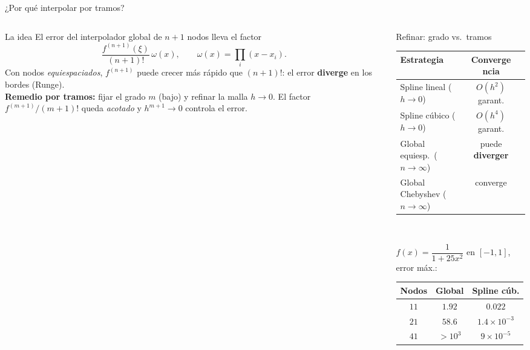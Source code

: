 \documentclass[aspectratio=169,10pt]{beamer}
\begin{document}
\begin{frame}{¿Por qué interpolar por tramos?}
\begin{columns}[T]
\begin{column}{0.49\textwidth}
\begin{cardidea}{La idea}{\faLightbulb}
{\footnotesize El error del interpolador global de $n{+}1$ nodos lleva el factor
\[
\frac{f^{(n+1)}(\xi)}{(n+1)!}\,\omega(x),\qquad \omega(x)=\prod_i(x-x_i).
\]
Con nodos \emph{equiespaciados}, $f^{(n+1)}$ puede crecer más rápido que $(n+1)!$: el error \textbf{diverge} en los bordes (Runge).\\[1.0mm]
\textbf{Remedio por tramos:} fijar el grado $m$ (bajo) y refinar la malla $h\to0$. El factor $f^{(m+1)}/(m+1)!$ queda \emph{acotado} y $h^{m+1}\to0$ controla el error.}
\end{cardidea}
\end{column}
\begin{column}{0.49\textwidth}
\begin{cardgear}{Refinar: grado vs.\ tramos}{\faTable}
\centering
{\footnotesize\renewcommand{\arraystretch}{1.22}\setlength{\tabcolsep}{5pt}
\begin{tabular}{l|cc}
Estrategia & Convergencia\\\hline
Spline lineal ($h\to0$) & $O(h^2)$ garant.\\
Spline cúbico ($h\to0$) & $O(h^4)$ garant.\\
Global equiesp.\ ($n\to\infty$) & puede \textbf{diverger}\\
Global Chebyshev ($n\to\infty$) & converge\\
\end{tabular}}\\[1.4mm]
{\footnotesize $f(x)=\dfrac{1}{1+25x^2}$ en $[-1,1]$, error máx.:\\[0.6mm]
\renewcommand{\arraystretch}{1.12}\setlength{\tabcolsep}{7pt}
\begin{tabular}{c|cc}
Nodos & Global & Spline cúb.\\\hline
$11$&$1.92$&$0.022$\\
$21$&$58.6$&$1.4\times10^{-3}$\\
$41$&$>10^3$&$9\times10^{-5}$\\
\end{tabular}}
\end{cardgear}
\end{column}
\end{columns}
\end{frame}
\end{document}
